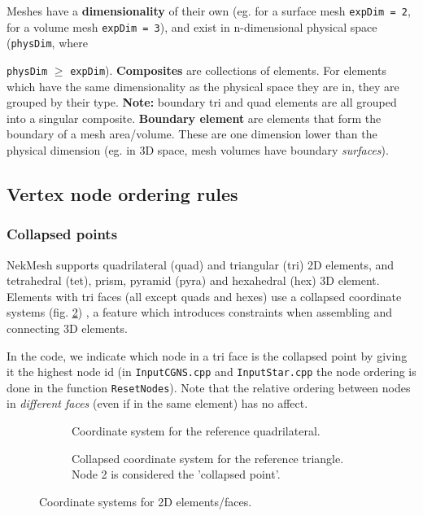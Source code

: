 Meshes have a \textbf{dimensionality} of their own (eg. for a surface
mesh \texttt{expDim = 2}, for a volume mesh \texttt{expDim = 3}), and
exist in n-dimensional physical space (\texttt{physDim}, where
{\texttt{physDim} $\geq$ \texttt{expDim}). \textbf{Composites} are
  collections of elements. For elements which have the same
  dimensionality as the physical space they are in, they are grouped
  by their type. \textbf{Note:} boundary tri and quad elements are all
  grouped into a singular composite. \textbf{Boundary element} are
  elements that form the boundary of a mesh area/volume. These are one
  dimension lower than the physical dimension (eg. in 3D space, mesh
  volumes have boundary \textit{surfaces}).

\subsection{Vertex node ordering rules}
\label{sect:node_ordering}
\subsubsection{Collapsed points} 
NekMesh supports quadrilateral (quad) and triangular (tri) 2D
elements, and tetrahedral (tet), prism, pyramid (pyra) and hexahedral
(hex) 3D element. Elements with tri faces (all except quads and hexes)
use a collapsed coordinate systems (fig. \ref{fig:collapsed_coords})
\cite{textbook}, a feature which introduces constraints when
assembling and connecting 3D elements.

In the code, we indicate which node in a tri face is the collapsed point by giving it the highest node id (in \texttt{InputCGNS.cpp} and \texttt{InputStar.cpp} the node ordering is done in the function \texttt{ResetNodes}). Note that the relative ordering between nodes in \textit{different faces} (even if in the same element) has no affect.

\begin{figure}[h!]
    \centering
    \begin{subfigure}[b]{0.45\textwidth}
        \centering
        
        \caption{Coordinate system for the reference quadrilateral.}
        \label{fig:quad_coords}
    \end{subfigure}
    \hfill
    \begin{subfigure}[b]{0.45\textwidth}
        \centering
        
        \caption{Collapsed coordinate system for the reference triangle. Node 2 is considered the 'collapsed point'.}
        \label{fig:collapsed_coords}
    \end{subfigure}
    \caption{Coordinate systems for 2D elements/faces.}
    \label{fig:coords}
\end{figure}

}
